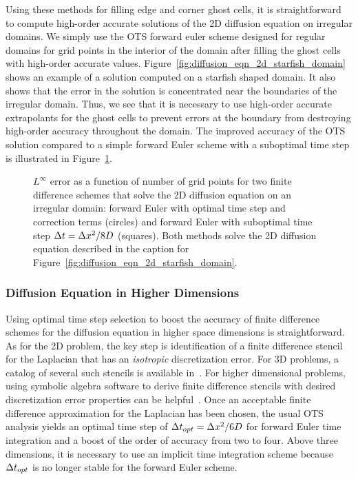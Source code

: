 \documentclass[oneeqnum,onefignum,onetabnum,onethmnum]{siamltex}
\begin{document}
Using these methods for filling edge and corner ghost cells, it is 
straightforward to compute high-order accurate solutions of the 2D diffusion 
equation on irregular domains.  We simply use the OTS forward euler scheme 
designed for regular domains for grid points in the interior of the domain
after filling the ghost cells with high-order accurate values.  
Figure~\ref{fig:diffusion_eqn_2d_starfish_domain} shows an example of 
a solution computed on a starfish shaped domain.  It also shows that the 
error in the solution is concentrated near the boundaries of the irregular
domain.  Thus, we see that it is necessary to use high-order accurate 
extrapolants for the ghost cells to prevent errors at the boundary from 
destroying high-order accuracy throughout the domain.  The improved accuracy 
of the OTS solution compared to a simple forward Euler scheme with a 
suboptimal time step is illustrated in 
Figure~\ref{fig:diffusion_eqn_2d_starfish_error}. 

\begin{figure}[tb]
\begin{center}
\caption{$L^\infty$ error as a function of number of grid points for two
finite difference schemes that solve the 2D diffusion equation on an 
irregular domain: forward Euler with optimal time step and correction 
terms (circles) and forward Euler with suboptimal time step $\Delta t = \Delta x^2/8 D$
(squares).  Both methods solve the 2D diffusion equation described in the 
caption for Figure~\ref{fig:diffusion_eqn_2d_starfish_domain}.
}
\label{fig:diffusion_eqn_2d_starfish_error}
\end{center}
\end{figure}


\subsubsection{Diffusion Equation in Higher Dimensions}
Using optimal time step selection to boost the accuracy of finite difference
schemes for the diffusion equation in higher space dimensions is 
straightforward.  As for the 2D problem, the key step is identification of a 
finite difference stencil for the Laplacian that has an \emph{isotropic} 
discretization error.  For 3D problems, a catalog of several such stencils is 
available in~\cite{patra_2005}.  For higher dimensional problems, using 
symbolic algebra software to derive finite difference stencils with desired 
discretization error properties can be helpful~\cite{patra_2005, gupta_1998}.  
Once an acceptable finite difference approximation for the Laplacian has been 
chosen, the usual OTS analysis yields an optimal time step of 
$\Delta t_{opt} = \Delta x^2/6D$ for forward Euler time integration and a boost of the 
order of accuracy from two to four.  Above three dimensions, it is necessary 
to use an implicit time integration scheme because $\Delta t_{opt}$ is no longer 
stable for the forward Euler scheme.
\end{document}

